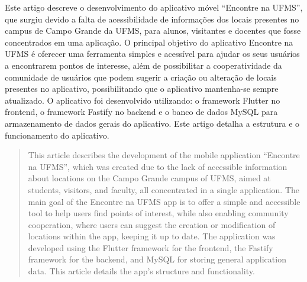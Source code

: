   \begin{resumo} 
    Este artigo descreve o desenvolvimento do aplicativo móvel ``Encontre na UFMS'', que surgiu devido a falta de acessibilidade de informações dos locais presentes no campus de Campo Grande da UFMS, para alunos, visitantes e docentes que fosse concentrados em uma aplicação. O principal objetivo do aplicativo Encontre na UFMS é oferecer uma ferramenta simples e acessível para ajudar os seus usuários a encontrarem pontos de interesse, além de possibilitar a cooperatividade da comunidade de usuários que podem sugerir a criação ou alteração de locais presentes no aplicativo, possibilitando que o aplicativo mantenha-se sempre atualizado. O aplicativo foi desenvolvido utilizando: o framework Flutter no frontend, o framework Fastify no backend e o banco de dados MySQL para armazenamento de dados gerais do aplicativo. Este artigo detalha a estrutura e o funcionamento do aplicativo.
  \end{resumo}
  
  \begin{abstract}
    This article describes the development of the mobile application ``Encontre na UFMS'', which was created due to the lack of accessible information about locations on the Campo Grande campus of UFMS, aimed at students, visitors, and faculty, all concentrated in a single application. The main goal of the Encontre na UFMS app is to offer a simple and accessible tool to help users find points of interest, while also enabling community cooperation, where users can suggest the creation or modification of locations within the app, keeping it up to date. The application was developed using the Flutter framework for the frontend, the Fastify framework for the backend, and MySQL for storing general application data. This article details the app's structure and functionality.
  \end{abstract}

  \newpage